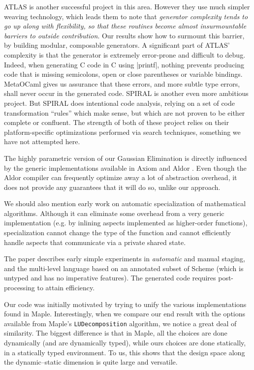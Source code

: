 \documentclass{elsart}
\begin{document}
ATLAS \cite{ATLAS} is another successful project in this area.
However they use much simpler weaving technology, which leads them to
note that \emph{generator complexity tends to go up along with
flexibility, so that these routines become almost insurmountable
barriers to outside contribution}. Our results show how to surmount
this barrier, by building modular, composable generators. A
significant part of ATLAS' complexity is that the generator is
extremely error-prone and difficult to debug.  Indeed, when generating
C code in C using |printf|, nothing prevents producing code that
is missing semicolons, open or close parentheses or variable
bindings. MetaOCaml gives us assurance that these errors, and more
subtle type errors, shall never occur in the generated code.  SPIRAL
\cite{Pueschel:05} is another even more ambitious project.  But
SPIRAL does intentional code analysis, relying on a set of code
transformation ``rules'' which make sense, but which are not proven to
be either complete or confluent.  The strength of both of these
project relies on their platform-specific optimizations performed via
search techniques, something we have not attempted here.

The highly parametric version of our Gaussian Elimination is directly
influenced by the generic implementations available in Axiom
\cite{Axiom} and Aldor \cite{Watt:2002:HCA}.  Even though the Aldor
compiler can frequently optimize away a lot of abstraction overhead, 
it does not provide any guarantees that it will do so, unlike our
approach.

We should also mention early work \cite{Gluck95} on automatic
specialization of mathematical algorithms. Although it can eliminate
some overhead from a very generic implementation (e.g. by inlining
aspects implemented as higher-order functions), specialization cannot
change the type of the function and cannot efficiently handle aspects
that communicate via a private shared state.

The paper \cite{GluckJ97} describes early simple experiments in
\emph{automatic} and manual staging, and the multi-level language
based on an annotated subset of Scheme (which is untyped and has no
imperative features). The generated code requires post-processing to
attain efficiency.

Our code was initially motivated by trying to unify the various
implementations found in Maple.  Interestingly, when we compare our end 
result with the options available from Maple's \texttt{LUDecomposition}
algorithm, we notice a great deal of similarity.  The biggest difference
is that in Maple, all the choices are done dynamically (and are dynamically
typed), while ours choices are done statically, in a statically typed
environment.  To us, this shows that the
design space along the dynamic--static dimension is quite large and
versatile.
\end{document}
